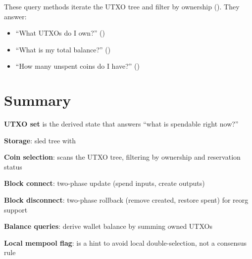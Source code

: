 \begin{notebox}
These query methods iterate the UTXO tree and filter by ownership (). They answer:
\begin{itemize}
  \item ``What UTXOs do I own?'' ()
  \item ``What is my total balance?'' ()
  \item ``How many unspent coins do I have?'' ()
\end{itemize}
\end{notebox}

\section{Summary}
\label{sec:ch09-4-summary}

\begin{chaptersummary}
\item \textbf{UTXO set} is the derived state that answers ``what is spendable right now?''
\item \textbf{Storage}: sled tree  with 
\item \textbf{Coin selection}:  scans the UTXO tree, filtering by ownership and reservation status
\item \textbf{Block connect}: two-phase update (spend inputs, create outputs)
\item \textbf{Block disconnect}: two-phase rollback (remove created, restore spent) for reorg support
\item \textbf{Balance queries}: derive wallet balance by summing owned UTXOs
\item \textbf{Local mempool flag}:  is a hint to avoid local double-selection, not a consensus rule
\end{chaptersummary}
